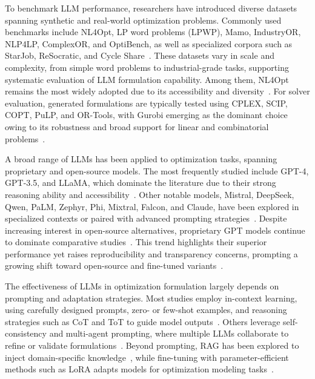 \documentclass[review,12pt]{elsarticle}
\begin{document}
To benchmark LLM performance, researchers have introduced diverse datasets spanning synthetic and real-world optimization problems. Commonly used benchmarks include NL4Opt, LP word problems (LPWP), Mamo, IndustryOR, NLP4LP, ComplexOR, and OptiBench, as well as specialized corpora such as StarJob, ReSocratic, and Cycle Share~\cite{li2023synthesizing,ahmed2024lm4opt,huang2024optibench,abgaryan2024llms,jiang2024llmopt,jiao2024city}. These datasets vary in scale and complexity, from simple word problems to industrial-grade tasks, supporting systematic evaluation of LLM formulation capability. Among them, NL4Opt remains the most widely adopted due to its accessibility and diversity~\cite{li2023synthesizing,ahmed2024lm4opt,jiang2024llmopt}.
For solver evaluation, generated formulations are typically tested using CPLEX, SCIP, COPT, PuLP, and OR-Tools, with Gurobi emerging as the dominant choice owing to its robustness and broad support for linear and combinatorial problems~\cite{huang2024optibench,xiao2023chain,wang2024leveraging,zhang2025or}.

A broad range of LLMs has been applied to optimization tasks, spanning proprietary and open-source models. The most frequently studied include GPT-4, GPT-3.5, and LLaMA, which dominate the literature due to their strong reasoning ability and accessibility~\cite{li2023synthesizing,huang2024optibench,abgaryan2024llms,anonymous2024starjob}. Other notable models, Mistral, DeepSeek, Qwen, PaLM, Zephyr, Phi, Mixtral, Falcon, and Claude, have been explored in specialized contexts or paired with advanced prompting strategies~\cite{tang2024orlm,jiang2024llmopt,chen2025solver,huang2025llms}.
Despite increasing interest in open-source alternatives, proprietary GPT models continue to dominate comparative studies~\cite{wang2025ormind,zhang2025or}. This trend highlights their superior performance yet raises reproducibility and transparency concerns, prompting a growing shift toward open-source and fine-tuned variants~\cite{liu2024variable,mostajabdaveh2024optimization}.

The effectiveness of LLMs in optimization formulation largely depends on prompting and adaptation strategies. Most studies employ in-context learning, using carefully designed prompts, zero- or few-shot examples, and reasoning strategies such as CoT and ToT to guide model outputs~\cite{wang2024bpp,li2024nl2or,wang2024large}. Others leverage self-consistency and multi-agent prompting, where multiple LLMs collaborate to refine or validate formulations~\cite{xiao2023chain,mostajabdaveh2024optimization,nammouchi2024towards}.
Beyond prompting, RAG has been explored to inject domain-specific knowledge~\cite{anonymous2024droc,zhang2024generative}, while fine-tuning with parameter-efficient methods such as LoRA adapts models for optimization modeling tasks~\cite{abgaryan2024llms,anonymous2024starjob,tang2024orlm}.
\end{document}
